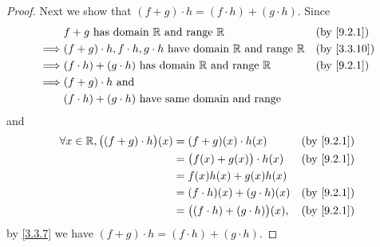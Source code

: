 \begin{proof}
  Next we show that \((f + g) \cdot h = (f \cdot h) + (g \cdot h)\).
  Since
  \begin{align*}
             & f + g \text{ has domain } \R \text{ and range } \R                                   &  & \by{9.2.1}  \\
    \implies & (f + g) \cdot h, f \cdot h, g \cdot h  \text{ have domain } \R \text{ and range } \R &  & \by{3.3.10} \\
    \implies & (f \cdot h) + (g \cdot h)  \text{ has domain } \R \text{ and range } \R              &  & \by{9.2.1}  \\
    \implies & (f + g) \cdot h \text{ and }                                                                          \\
             & (f \cdot h) + (g \cdot h) \text{ have same domain and range}
  \end{align*}
  and
  \begin{align*}
    \forall x \in \R, \big((f + g) \cdot h\big)(x) & = (f + g)(x) \cdot h(x)                   &  & \by{9.2.1} \\
                                                   & = \big(f(x) + g(x)\big) \cdot h(x)        &  & \by{9.2.1} \\
                                                   & = f(x)h(x) + g(x)h(x)                                     \\
                                                   & = (f \cdot h)(x) + (g \cdot h)(x)         &  & \by{9.2.1} \\
                                                   & = \big((f \cdot h) + (g \cdot h)\big)(x), &  & \by{9.2.1}
  \end{align*}
  by \cref{3.3.7} we have \((f + g) \cdot h = (f \cdot h) + (g \cdot h)\).


\end{proof}
